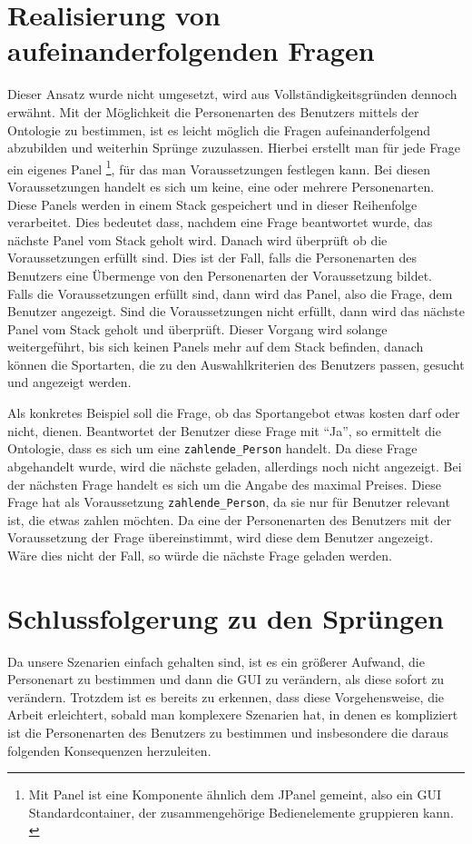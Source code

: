 \section{Realisierung von aufeinanderfolgenden Fragen}
Dieser Ansatz wurde nicht umgesetzt, wird aus Vollständigkeitsgründen dennoch erwähnt. Mit der Möglichkeit die Personenarten des Benutzers mittels der Ontologie zu bestimmen, ist es leicht möglich die Fragen aufeinanderfolgend abzubilden und weiterhin Sprünge zuzulassen. Hierbei erstellt man für jede Frage ein eigenes Panel \footnote{Mit Panel ist eine Komponente ähnlich dem JPanel gemeint, also ein GUI Standardcontainer, der zusammengehörige Bedienelemente gruppieren kann. \autocite{petri:jpanel}}, für das man Voraussetzungen festlegen kann. Bei diesen Voraussetzungen handelt es sich um keine, eine oder mehrere Personenarten. Diese Panels werden in einem Stack gespeichert und in dieser Reihenfolge verarbeitet. Dies bedeutet dass, nachdem eine Frage beantwortet wurde, das nächste Panel vom Stack geholt wird. Danach wird überprüft ob die Voraussetzungen erfüllt sind. Dies ist der Fall, falls die Personenarten des Benutzers eine Übermenge von den Personenarten der Voraussetzung bildet. \\
Falls die Voraussetzungen erfüllt sind, dann wird das Panel, also die Frage, dem Benutzer angezeigt. Sind die Voraussetzungen nicht erfüllt, dann wird das nächste Panel vom Stack geholt und überprüft. Dieser Vorgang wird solange weitergeführt, bis sich keinen Panels mehr auf dem Stack befinden, danach können die Sportarten, die zu den Auswahlkriterien des Benutzers passen, gesucht und angezeigt werden.

Als konkretes Beispiel soll die Frage, ob das Sportangebot etwas kosten darf oder nicht, dienen. Beantwortet der Benutzer diese Frage mit "`Ja"', so ermittelt die Ontologie, dass es sich um eine \lstinline"zahlende_Person" handelt. Da diese Frage abgehandelt wurde, wird die nächste geladen, allerdings noch nicht angezeigt. Bei der nächsten Frage handelt es sich um die Angabe des maximal Preises. Diese Frage hat als Voraussetzung \lstinline"zahlende_Person", da sie nur für Benutzer relevant ist, die etwas zahlen möchten. Da eine der Personenarten des Benutzers mit der Voraussetzung der Frage übereinstimmt, wird diese dem Benutzer angezeigt. Wäre dies nicht der Fall, so würde die nächste Frage geladen werden.

\section{Schlussfolgerung zu den Sprüngen}
Da unsere Szenarien einfach gehalten sind, ist es ein größerer Aufwand, die Personenart zu bestimmen und dann die GUI zu verändern, als diese sofort zu verändern. Trotzdem ist es bereits zu erkennen, dass diese Vorgehensweise, die Arbeit erleichtert, sobald man komplexere Szenarien hat, in denen es kompliziert ist die Personenarten des Benutzers zu bestimmen und insbesondere die daraus folgenden Konsequenzen herzuleiten.